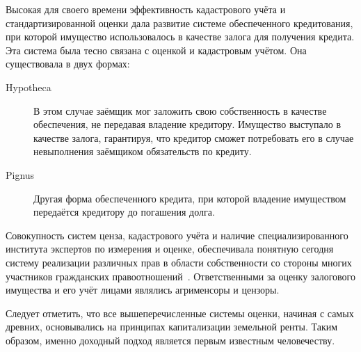 \documentclass[12pt]{scrartcl}
\begin{document}
Высокая для своего времени эффективность кадастрового учёта и стандартизированной оценки дала развитие системе обеспеченного кредитования, при которой имущество использовалось в качестве залога для получения кредита. Эта система была тесно связана с оценкой и кадастровым учётом. Она существовала в двух формах:
\begin{description}
    \item[Hypotheca] В этом случае заёмщик мог заложить свою собственность в качестве обеспечения, не передавая владение кредитору. Имущество выступало в качестве залога, гарантируя, что кредитор сможет потребовать его в случае невыполнения заёмщиком обязательств по кредиту.
    \item[Pignus] Другая форма обеспеченного кредита, при которой владение имуществом передаётся кредитору до погашения долга.
\end{description}
Совокупность систем ценза, кадастрового учёта и наличие специализированного института экспертов по измерения и оценке, обеспечивала понятную сегодня систему реализации различных прав в области собственности со стороны многих участников гражданских правоотношений~\cite{Veyne1996}. Ответственными за оценку залогового имущества и его учёт лицами являлись агрименсоры и цензоры.

Следует отметить, что все вышеперечисленные системы оценки, начиная с самых древних, основывались на принципах капитализации земельной ренты. Таким образом, именно доходный подход является первым известным человечеству.
\end{document}
